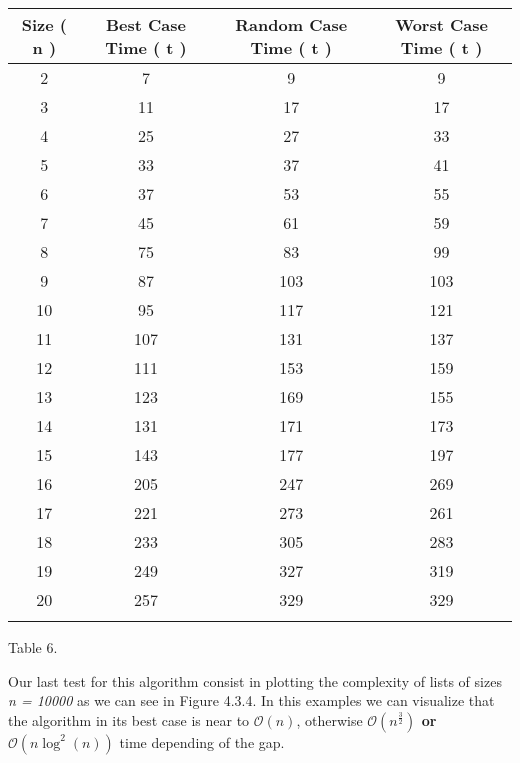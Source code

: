 {\small
\begin{center} 
\begin{tabular}[.5cm]{ c c c c } 
\toprule \toprule
\hspace {5px} Size ( n ) \hspace {5px} & \hspace {15px} Best Case Time ( t ) \hspace {15px} & \hspace {15px} Random Case Time ( t ) \hspace {15px} & \hspace {15px} Worst Case Time ( t ) \hspace {15px} \\ 
\midrule \midrule
2 & 7 & 9 & 9 \\ 
\cmidrule {1-4} 
3 & 11 & 17 & 17 \\ 
\cmidrule {1-4} 
4 & 25 & 27 & 33 \\ 
\cmidrule {1-4} 
5 & 33 & 37 & 41 \\ 
\cmidrule {1-4} 
6 & 37 & 53 & 55 \\ 
\cmidrule {1-4} 
7 & 45 & 61 & 59 \\ 
\cmidrule {1-4} 
8 & 75 & 83 & 99 \\ 
\cmidrule {1-4} 
9 & 87 & 103 & 103 \\ 
\cmidrule {1-4} 
10 & 95 & 117 & 121 \\ 
\cmidrule {1-4} 
11 & 107 & 131 & 137 \\ 
\cmidrule {1-4} 
12 & 111 & 153 & 159 \\ 
\cmidrule {1-4} 
13 & 123 & 169 & 155 \\ 
\cmidrule {1-4} 
14 & 131 & 171 & 173 \\ 
\cmidrule {1-4} 
15 & 143 & 177 & 197 \\ 
\cmidrule {1-4} 
16 & 205 & 247 & 269 \\ 
\cmidrule {1-4} 
17 & 221 & 273 & 261 \\ 
\cmidrule {1-4} 
18 & 233 & 305 & 283 \\ 
\cmidrule {1-4} 
19 & 249 & 327 & 319 \\ 
\cmidrule {1-4} 
20 & 257 & 329 & 329 \\ 
\bottomrule 
\linebreak 
\end{tabular} 
\linebreak \linebreak Table 6.
\end{center}}

\pagebreak

Our last test for this algorithm consist in plotting the complexity of lists of sizes {\itshape n = 10000} as we can see in Figure 4.3.4. In this examples we can visualize that the algorithm in its best case is near to {\bfseries $\mathcal{O}(n)$}, otherwise {\bfseries $\mathcal{O}(n^{\frac{3}{2}})$ or $\mathcal{O}(n\log^{2}(n))$} time depending of the gap. \hfill \break

